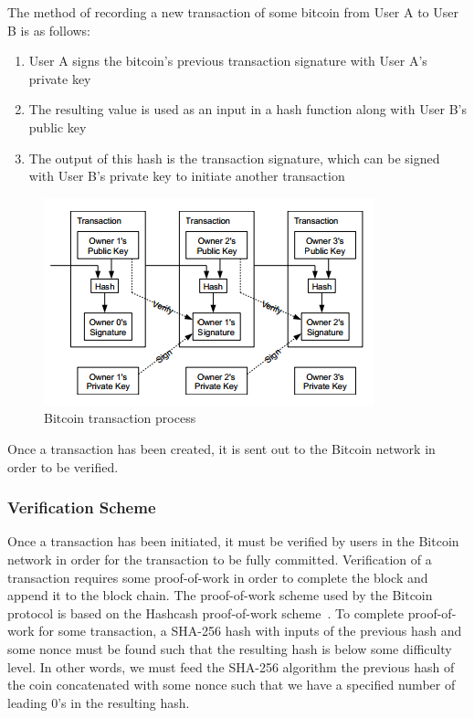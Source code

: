 \documentclass[11pt]{article}
\begin{document}
\begin{minipage}{\linewidth}
The method of recording a new transaction of some bitcoin from User A to User
B is as follows:
\begin{enumerate}
    \item User A signs the bitcoin's previous transaction signature with User
        A's private key
    \item The resulting value is used as an input in a hash function along
        with User B's public key
    \item The output of this hash is the transaction signature, which can be
        signed with User B's private key to initiate another transaction
\end{enumerate}
\end{minipage}
\begin{figure}[H]
    \caption{Bitcoin transaction process~\cite{nakamoto08}}
    \centering
    \includegraphics{figures/transaction.png}
\end{figure}

Once a transaction has been created, it is sent out to the Bitcoin network in
order to be verified.

\subsubsection{Verification Scheme}
Once a transaction has been initiated, it must be verified by users in the
Bitcoin network in order for the transaction to be fully committed. Verification
of a transaction requires some proof-of-work in order to complete the block and
append it to the block chain. The proof-of-work scheme used by the Bitcoin
protocol is based on the Hashcash proof-of-work scheme~\cite{back02}. 
To complete proof-of-work for some transaction, a
SHA-256 hash with inputs of the previous hash and some nonce must be found such
that the resulting hash is below some difficulty level. In other words, we must
feed the SHA-256 algorithm the previous hash of the coin concatenated with some
nonce such that we have a specified number of leading 0's in the resulting hash.
\end{document}
